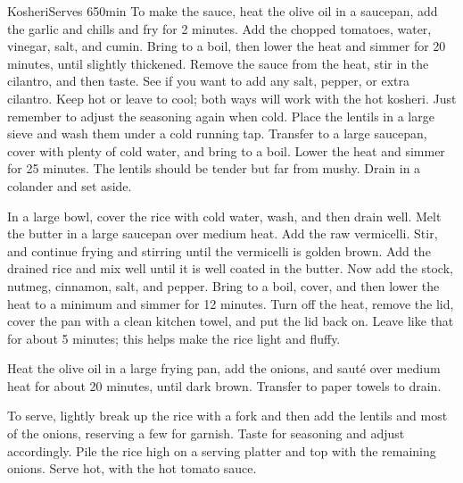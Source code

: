 \begin{recipe}{Kosheri}{Serves 6}{50min}
To make the sauce, heat the olive oil in a saucepan, add the garlic and chills and fry for 2 minutes. Add the chopped tomatoes, water, vinegar, salt, and cumin. Bring to a boil, then lower the heat and simmer for 20 minutes, until slightly thickened. Remove the sauce from the heat, stir in the cilantro, and then taste. See if you want to add any salt, pepper, or extra cilantro. Keep hot or leave to cool; both ways will work with the hot kosheri. Just remember to adjust the seasoning again when cold.
Place the lentils in a large sieve and wash them under a cold running tap. Transfer to a large saucepan, cover with plenty of cold water, and bring to a boil. Lower the heat and simmer for 25 minutes. The lentils should be tender but far from mushy. Drain in a colander and set aside.

In a large bowl, cover the rice with cold water, wash, and then drain well. Melt the butter in a large saucepan over medium heat. Add the raw vermicelli. Stir, and continue frying and stirring until the vermicelli is golden brown. Add the drained rice and mix well until it is well coated in the butter. Now add the stock, nutmeg, cinnamon, salt, and pepper. Bring to a boil, cover, and then lower the heat to a minimum and simmer for 12 minutes. Turn off the heat, remove the lid, cover the pan with a clean kitchen towel, and put the lid back on. Leave like that for about 5 minutes; this helps make the rice light and fluffy.

Heat the olive oil in a large frying pan, add the onions, and sauté over medium heat for about 20 minutes, until dark brown. Transfer to paper towels to drain.

To serve, lightly break up the rice with a fork and then add the lentils and most of the onions, reserving a few for garnish. Taste for seasoning and adjust accordingly. Pile the rice high on a serving platter and top with the remaining onions. Serve hot, with the hot tomato sauce.
\end{recipe}
